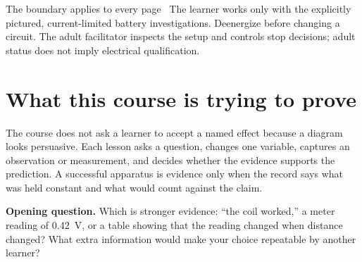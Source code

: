 


\newcommand{\stepplate}[3]{%
  \begin{minipage}[t]{.31\linewidth}
  \centering #1\par\vspace{.15em}
  {\small\bfseries #2}\par
  {\footnotesize #3}
  \end{minipage}}
\newcommand{\checkline}{\rule{.97\linewidth}{.3pt}}



\begin{teloshazard}{The boundary applies to every page}
\boundary\ The learner works only with the explicitly pictured, current-limited
battery investigations. Deenergize before changing a circuit. The adult
facilitator inspects the setup and controls stop decisions; adult status does
not imply electrical qualification.
\end{teloshazard}

\section{What this course is trying to prove}
The course does not ask a learner to accept a named effect because a diagram
looks persuasive. Each lesson asks a question, changes one variable, captures
an observation or measurement, and decides whether the evidence supports the
prediction. A successful apparatus is evidence only when the record says what
was held constant and what would count against the claim.

\begin{predict}
\textbf{Opening question.} Which is stronger evidence: ``the coil worked,'' a
meter reading of \qty{0.42}{V}, or a table showing that the reading changed
when distance changed? What extra information would make your choice
repeatable by another learner?
\end{predict}

